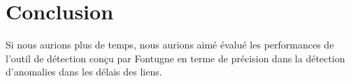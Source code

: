 \chapter*{Conclusion}











%
 
 


Si nous aurions plus de temps, nous aurions aimé évalué les performances de l'outil de détection conçu par Fontugne\cite{DBLP:journals/corr/FontugneAPB16} en terme de précision dans la détection d'anomalies dans les délais des liens. 







